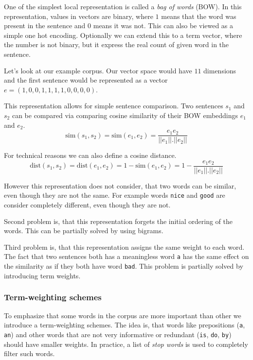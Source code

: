         One of the simplest local representation is called a \textit{bag of words} (BOW). 
        In this representation, values in vectors are binary, where $1$ means that the word was present in the sentence and $0$ means it was not.
        This can also be viewed as a simple one hot encoding.
        Optionally we can extend this to a term vector, where the number is not binary, but it express the real count of given word in the sentence.
        
        Let's look at our example corpus. 
        Our vector space would have $11$ dimensions and the first sentence would be represented as a vector
        $e = (1, 0, 0, 1, 1, 1, 1, 0, 0, 0, 0)$.
        
        This representation allows for simple sentence comparison. 
        Two sentences $s_1$ and $s_2$ can be compared via comparing cosine similarity of their BOW embeddings $e_1$ and $e_2$.
        $$\mathrm{sim}(s_1, s_2) = \mathrm{sim}(e_1, e_2) = \frac{e_1 e_2}{||e_1||.||e_2||}$$
        
        For technical reasons we can also define a cosine distance. 
        $$\mathrm{dist}(s_1, s_2) = \mathrm{dist}(e_1, e_2) = 1- \mathrm{sim}(e_1, e_2) = 1 - \frac{e_1 e_2}{||e_1||.||e_2||}$$
        
        However this representation does not consider, that two words can be similar, even though they are not the same.
        For example words \texttt{nice} and \texttt{good} are consider completely different, even though they are not. 
        
        Second problem is, that this representation forgets the initial ordering of the words.
        This can be partially solved by using bigrams.
        
        Third problem is, that this representation assigns the same weight to each word.
        The fact that two sentences both has a meaningless word \texttt{a} has the same effect on the similarity as 
        if they both have word \texttt{bad}. 
        This problem is partially solved by introducing term weights.
        
        \subsubsection{Term-weighting schemes}
        To emphasize that some words in the corpus are more important than other we introduce a term-weighting schemes. 
        The idea is, that words like prepositions (\texttt{a}, \texttt{an}) and other words that are not very informative or redundant (\texttt{is}, \texttt{do}, \texttt{by}) should have smaller weights. 
        In practice, a list of \textit{stop words} is used to completely filter such words.
        
